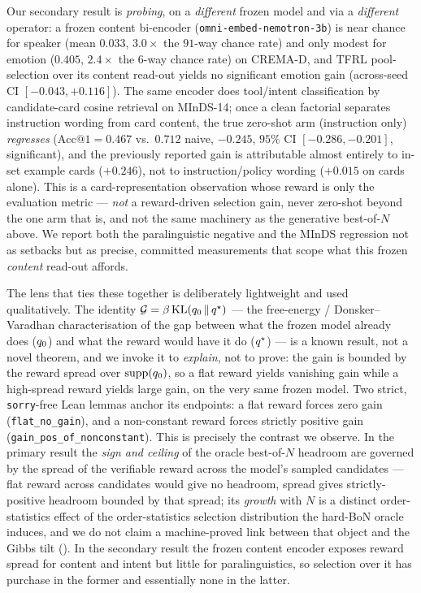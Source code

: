 Our secondary result is \emph{probing}, on a \emph{different} frozen model and via a \emph{different}
operator: a frozen content bi-encoder (\texttt{omni-embed-nemotron-3b}) is near chance for speaker
(mean $0.033$, $3.0\times$ the $91$-way chance rate) and only modest for emotion ($0.405$, $2.4\times$
the $6$-way chance rate) on CREMA-D, and TFRL pool-selection over its content read-out yields
no significant emotion gain (across-seed CI $[-0.043,+0.116]$). The same encoder does tool/intent
classification by candidate-card cosine retrieval on MInDS-14; once a clean factorial separates
instruction wording from card content, the true zero-shot arm (instruction only) \emph{regresses}
($\mathrm{Acc@1}=0.467$ vs.\ $0.712$ naive, $-0.245$, $95\%$ CI $[-0.286,-0.201]$, significant), and the
previously reported gain is attributable almost entirely to in-set example cards ($+0.246$), not to
instruction/policy wording ($+0.015$ on cards alone). This is a card-representation observation whose
reward is only the evaluation metric --- \emph{not} a reward-driven selection gain, never zero-shot
beyond the one arm that is, and not the same machinery as the generative best-of-$N$ above. We report
both the paralinguistic negative and the MInDS regression not as setbacks but as precise, committed
measurements that scope what this frozen \emph{content} read-out affords.

The lens that ties these together is deliberately lightweight and used qualitatively. The identity
$\mathcal{G}=\beta\,\mathrm{KL}\!\left(q_{0} \,\|\, q^{\star}\right)$ --- the free-energy / Donsker--Varadhan characterisation of the gap between
what the frozen model already does ($q_{0}$) and what the reward would have it do ($q^{\star}$) --- is a known
result, not a novel theorem, and we invoke it to \emph{explain}, not to prove: the gain is bounded by
the reward spread over $\mathrm{supp}(q_{0})$, so a flat reward yields vanishing gain while a high-spread
reward yields large gain, on the very same frozen model. Two strict, \texttt{sorry}-free Lean lemmas
anchor its endpoints: a flat reward forces zero gain (\texttt{flat\_no\_gain}), and a non-constant
reward forces strictly positive gain (\texttt{gain\_pos\_of\_nonconstant}). This is precisely the
contrast we observe. In the primary result the \emph{sign and ceiling} of the oracle best-of-$N$ headroom are governed by the
spread of the verifiable reward across the model's sampled candidates --- flat reward across candidates
would give no headroom, spread gives strictly-positive headroom bounded by that spread; its \emph{growth}
with $N$ is a distinct order-statistics effect of the order-statistics selection distribution the
hard-BoN oracle induces, and we do not claim a machine-proved link between that object and the Gibbs
tilt (). In the secondary result the
frozen content encoder exposes reward spread for content and intent but little for paralinguistics, so
selection over it has purchase in the former and essentially none in the latter.

